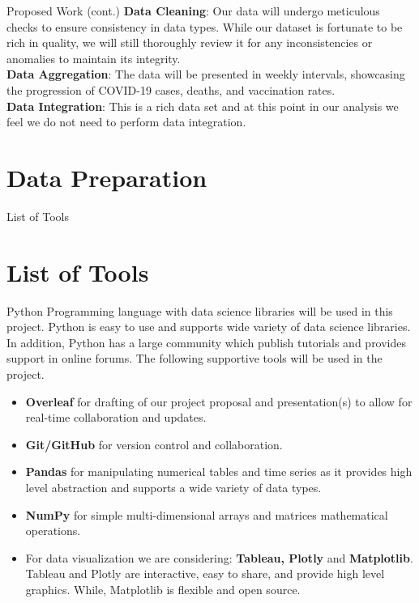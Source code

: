 \documentclass{beamer}
\begin{document}
\begin{frame}[fragile]{Proposed Work (cont.)}
\textbf{Data Cleaning}: Our data will undergo meticulous checks to ensure consistency in data types. While our dataset is fortunate to be rich in quality, we will still thoroughly review it for any inconsistencies or anomalies to maintain its integrity. \\
\vspace{5}
\textbf{Data Aggregation}: The data will be presented in weekly intervals, showcasing the progression of COVID-19 cases, deaths, and vaccination rates. \\ 
\vspace{5}
\textbf{Data Integration}: This is a rich data set and at this point in our analysis we feel we do not need to perform data integration. 
\section{Data Preparation}
\end{frame}

\begin{frame}[fragile]{List of Tools}
\section{List of Tools} 
Python Programming language with data science libraries will be used in this project. Python is easy to use and supports wide variety of data science libraries. In addition, Python has a large community which publish tutorials and provides support in online forums.
The following supportive tools will be used in the project. 
\begin{itemize}
\item \textbf{Overleaf} for drafting of our project proposal and presentation(s) to allow for real-time collaboration and updates.
\item \textbf{Git/GitHub} for version control and collaboration.
\item \textbf{Pandas} for manipulating numerical tables and time series as it provides high level abstraction and supports a wide variety of data types.
\item \textbf{NumPy} for simple multi-dimensional arrays and matrices mathematical operations.
\item For data visualization we are considering: \textbf{Tableau, Plotly} and \textbf{Matplotlib}. Tableau and Plotly are interactive, easy to share, and provide high level graphics. While, Matplotlib is flexible and open source. 
\end{itemize}
\end{frame}
\end{document}
